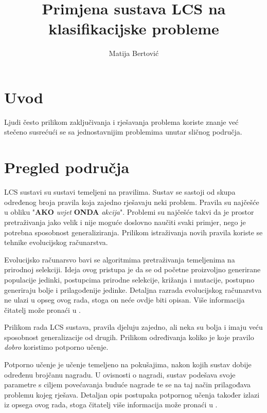\documentclass[times, utf8, zavrsni]{fer}
\begin{document}

\title{Primjena sustava LCS na klasifikacijske probleme}

\author{Matija Bertović}

\maketitle

\izvornik

\zahvala{}

\tableofcontents

\chapter{Uvod}
Ljudi često prilikom zaključivanja i rješavanja problema koriste znanje već stečeno susrećući se sa jednostavnijim problemima unutar sličnog područja.


\chapter{Pregled područja}
LCS sustavi su sustavi temeljeni na pravilima.
Sustav se sastoji od skupa određenog broja pravila koja zajedno rješavaju neki problem.
Pravila su najčešće u obliku "\textbf{AKO} \emph{uvjet} \textbf{ONDA} \emph{akcija}".
Problemi su najčešće takvi da je prostor pretraživanja jako velik i nije moguće doslovno naučiti svaki primjer, nego je potrebna sposobnost generaliziranja.
Prilikom istraživanja novih pravila koriste se tehnike evolucijskog računarstva.

Evolucijsko računarsvo bavi se algoritmima pretraživanja temeljenima na prirodnoj selekciji.
Ideja ovog pristupa je da se od početne proizvoljno generirane populacije jedinki, postupcima prirodne selekcije, križanja i mutacije, postupno generiraju bolje i prilagođenije jedinke.
Detaljna razrada evolucijskog računarstva ne ulazi u opseg ovog rada, stoga on neće ovdje biti opisan.
Više informacija čitatelj može pronaći u \citep{6}.

Prilikom rada LCS sustava, pravila djeluju zajedno, ali neka su bolja i imaju veću sposobnost generalizacije od drugih.
Prilikom određivanja koliko je koje pravilo \emph{dobro} koristimo potporno učenje.

Potporno učenje je učenje temeljeno na pokušajima, nakon kojih sustav dobije određenu brojčanu nagradu.
U ovisnosti o nagradi, sustav podešava svoje parametre s ciljem povećavanja buduće nagrade te se na taj način prilagođava problemu kojeg rješava.
Detaljan opis postupaka potpornog učenja također izlazi iz opsega ovog rada, stoga čitatelj više informacija može pronaći u \citep{7}.
\end{document}
